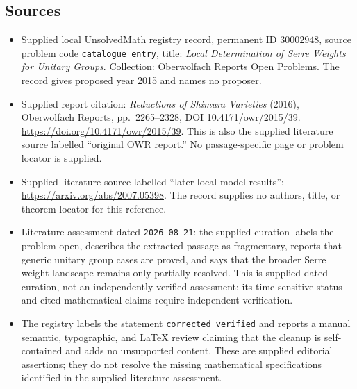 \documentclass[11pt]{article}
\begin{document}
\subsection{Sources}
\begin{itemize}
\item Supplied local UnsolvedMath registry record, permanent ID \(30002948\), source problem code \texttt{catalogue entry}, title: \emph{Local Determination of Serre Weights for Unitary Groups}. Collection: Oberwolfach Reports Open Problems. The record gives proposed year 2015 and names no proposer.
\item Supplied report citation: \emph{Reductions of Shimura Varieties} (2016), Oberwolfach Reports, pp.\ 2265--2328, DOI 10.4171/owr/2015/39. \url{https://doi.org/10.4171/owr/2015/39}. This is also the supplied literature source labelled ``original OWR report.'' No passage-specific page or problem locator is supplied.
\item Supplied literature source labelled ``later local model results'': \url{https://arxiv.org/abs/2007.05398}. The record supplies no authors, title, or theorem locator for this reference.
\item Literature assessment dated \texttt{2026-08-21}: the supplied curation labels the problem open, describes the extracted passage as fragmentary, reports that generic unitary group cases are proved, and says that the broader Serre weight landscape remains only partially resolved. This is supplied dated curation, not an independently verified assessment; its time-sensitive status and cited mathematical claims require independent verification.
\item The registry labels the statement \texttt{corrected\_verified} and reports a manual semantic, typographic, and LaTeX review claiming that the cleanup is self-contained and adds no unsupported content. These are supplied editorial assertions; they do not resolve the missing mathematical specifications identified in the supplied literature assessment.
\end{itemize}
\end{document}
